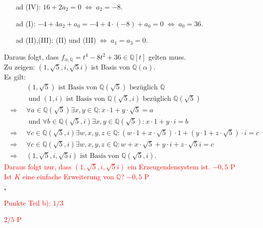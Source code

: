 \documentclass[12pt]{article}
\newcommand{\corr}[1]{\textcolor{red}{#1}}
\newcommand{\QED}{\begin{flushright} $\square$ \end{flushright}}
\newcommand{\df}{\enspace\Longrightarrow\enspace}
\newcommand{\gdw}{\;\Longleftrightarrow\;}
\begin{document}
\begin{enumerate}
\begin{enumerate}
		\item[ad (IV):] $16+2a_2=0\gdw a_2=-8$.
		\item[ad (I):] $-4+4a_2+a_0=-4+4\cdot(-8)+a_0=0\gdw a_0=36$.
		\item[ad (II),(III):] (II) und (III)$\gdw a_1=a_3=0$.
	\end{enumerate}
	Daraus folgt, dass $f_{\alpha,\mathbb{Q}}=t^4-8t^2+36\in\mathbb{Q}[t]$ gelten muss. \\
	
	Zu zeigen: $(1,\sqrt{5},i,\sqrt{5}i)$ ist Basis von $\mathbb{Q}(\alpha)$. \\
	Es gilt:
	\begin{align*}
		&(1,\sqrt{5})\text{ ist Basis von }\mathbb{Q}(\sqrt{5})\text{ bezüglich }\mathbb{Q} \\
		&\text{ und }(1,i)\text{ ist Basis von }\mathbb{Q}(\sqrt{5},i)\text{ bezüglich }\mathbb{Q}(\sqrt{5}) \\
		\df&\forall a\in\mathbb{Q}(\sqrt{5})\exists x,y\in\mathbb{Q}:x\cdot1+y\cdot\sqrt{5}=a \\
		&\text{ und }\forall b\in\mathbb{Q}(\sqrt{5},i)\exists x,y\in\mathbb{Q}(\sqrt{5}):x\cdot1+y\cdot i=b \\
		\df&\forall c\in\mathbb{Q}(\sqrt{5},i)\exists w,x,y,z\in\mathbb{Q}:(w\cdot1+x\cdot\sqrt{5})\cdot1+(y\cdot1+z\cdot\sqrt{5})\cdot i=c \\
		\df&\forall c\in\mathbb{Q}(\sqrt{5},i)\exists w,x,y,z\in\mathbb{Q}:w+x\cdot\sqrt{5}+y\cdot i+z\cdot\sqrt{5}i=c \\
		\df&(1,\sqrt{5},i,\sqrt{5}i)\text{ ist Basis von }\mathbb{Q}(\sqrt{5},i).
	\end{align*}
\corr{Daraus folgt nur, dass $(1,\sqrt{5},i,\sqrt{5}i)$ ein Erzeugendensystem ist. $-0,5$ P}\\
\corr{Ist $K$ eine einfache Erweiterung von $\mathbb{Q}$? $-0,5$ P}
	\QED
\corr{Punkte Teil b): $1/3$}
\end{enumerate}
\corr{$2/5$ P}
\end{document}
